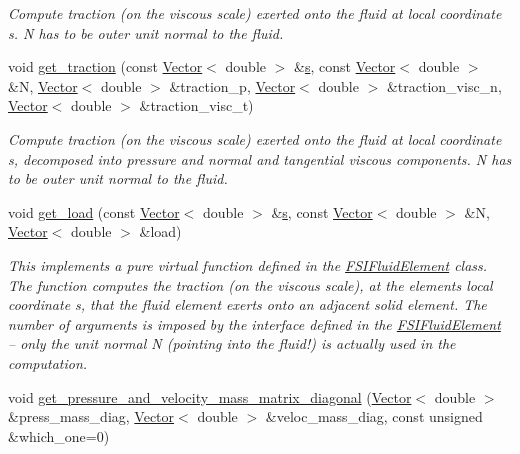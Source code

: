 \begin{DoxyCompactItemize}
\begin{DoxyCompactList}\small\item\em Compute traction (on the viscous scale) exerted onto the fluid at local coordinate s. N has to be outer unit normal to the fluid. \end{DoxyCompactList}\item 
void \hyperlink{classoomph_1_1NavierStokesEquations_a1be4be78ea52f3bf5814dd4d13f766cf}{get\+\_\+traction} (const \hyperlink{classoomph_1_1Vector}{Vector}$<$ double $>$ \&\hyperlink{cfortran_8h_ab7123126e4885ef647dd9c6e3807a21c}{s}, const \hyperlink{classoomph_1_1Vector}{Vector}$<$ double $>$ \&N, \hyperlink{classoomph_1_1Vector}{Vector}$<$ double $>$ \&traction\+\_\+p, \hyperlink{classoomph_1_1Vector}{Vector}$<$ double $>$ \&traction\+\_\+visc\+\_\+n, \hyperlink{classoomph_1_1Vector}{Vector}$<$ double $>$ \&traction\+\_\+visc\+\_\+t)
\begin{DoxyCompactList}\small\item\em Compute traction (on the viscous scale) exerted onto the fluid at local coordinate s, decomposed into pressure and normal and tangential viscous components. N has to be outer unit normal to the fluid. \end{DoxyCompactList}\item 
void \hyperlink{classoomph_1_1NavierStokesEquations_af2e10e52fc3a54b580e330fd763aa9f5}{get\+\_\+load} (const \hyperlink{classoomph_1_1Vector}{Vector}$<$ double $>$ \&\hyperlink{cfortran_8h_ab7123126e4885ef647dd9c6e3807a21c}{s}, const \hyperlink{classoomph_1_1Vector}{Vector}$<$ double $>$ \&N, \hyperlink{classoomph_1_1Vector}{Vector}$<$ double $>$ \&load)
\begin{DoxyCompactList}\small\item\em This implements a pure virtual function defined in the \hyperlink{classoomph_1_1FSIFluidElement}{F\+S\+I\+Fluid\+Element} class. The function computes the traction (on the viscous scale), at the element\textquotesingle{}s local coordinate s, that the fluid element exerts onto an adjacent solid element. The number of arguments is imposed by the interface defined in the \hyperlink{classoomph_1_1FSIFluidElement}{F\+S\+I\+Fluid\+Element} -- only the unit normal N (pointing into the fluid!) is actually used in the computation. \end{DoxyCompactList}\item 
void \hyperlink{classoomph_1_1NavierStokesEquations_a2d6e748dd25be78b65f927cd2b257c55}{get\+\_\+pressure\+\_\+and\+\_\+velocity\+\_\+mass\+\_\+matrix\+\_\+diagonal} (\hyperlink{classoomph_1_1Vector}{Vector}$<$ double $>$ \&press\+\_\+mass\+\_\+diag, \hyperlink{classoomph_1_1Vector}{Vector}$<$ double $>$ \&veloc\+\_\+mass\+\_\+diag, const unsigned \&which\+\_\+one=0)

\end{DoxyCompactItemize}
